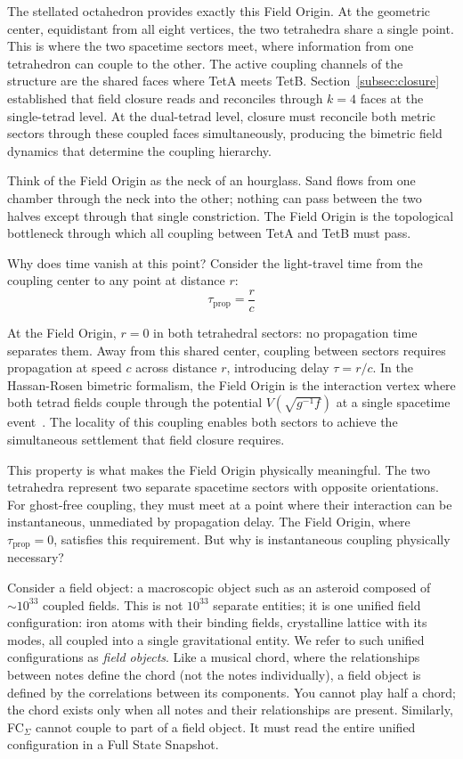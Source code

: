\documentclass[aps,prd,preprint,superscriptaddress,showpacs,preprintnumbers,amsmath,amssymb,nofootinbib]{revtex4-2}
\begin{document}
The stellated octahedron provides exactly this Field Origin. At the geometric center, equidistant from all eight vertices, the two tetrahedra share a single point. This is where the two spacetime sectors meet, where information from one tetrahedron can couple to the other. The active coupling channels of the structure are the shared faces where TetA meets TetB. Section~\ref{subsec:closure} established that field closure reads and reconciles through $k = 4$ faces at the single-tetrad level. At the dual-tetrad level, closure must reconcile both metric sectors through these coupled faces simultaneously, producing the bimetric field dynamics that determine the coupling hierarchy.

Think of the Field Origin as the neck of an hourglass. Sand flows from one chamber through the neck into the other; nothing can pass between the two halves except through that single constriction. The Field Origin is the topological bottleneck through which all coupling between TetA and TetB must pass.

Why does time vanish at this point? Consider the light-travel time from the coupling center to any point at distance $r$:
\begin{equation}
\tau_{\text{prop}} = \frac{r}{c}
\end{equation}

At the Field Origin, $r = 0$ in both tetrahedral sectors: no propagation time separates them. Away from this shared center, coupling between sectors requires propagation at speed $c$ across distance $r$, introducing delay $\tau = r/c$. In the Hassan-Rosen bimetric formalism, the Field Origin is the interaction vertex where both tetrad fields couple through the potential $V(\sqrt{g^{-1}f})$ at a single spacetime event~\cite{hassan2012}. The locality of this coupling enables both sectors to achieve the simultaneous settlement that field closure requires.

This property is what makes the Field Origin physically meaningful. The two tetrahedra represent two separate spacetime sectors with opposite orientations. For ghost-free coupling, they must meet at a point where their interaction can be instantaneous, unmediated by propagation delay. The Field Origin, where $\tau_{\text{prop}} = 0$, satisfies this requirement. But why is instantaneous coupling physically necessary?

Consider a field object: a macroscopic object such as an asteroid composed of $\sim 10^{33}$ coupled fields. This is not $10^{33}$ separate entities; it is one unified field configuration: iron atoms with their binding fields, crystalline lattice with its modes, all coupled into a single gravitational entity. We refer to such unified configurations as \emph{field objects}. Like a musical chord, where the relationships between notes define the chord (not the notes individually), a field object is defined by the correlations between its components. You cannot play half a chord; the chord exists only when all notes and their relationships are present. Similarly, FC$_{\Sigma}$ cannot couple to part of a field object. It must read the entire unified configuration in a Full State Snapshot.
\end{document}
